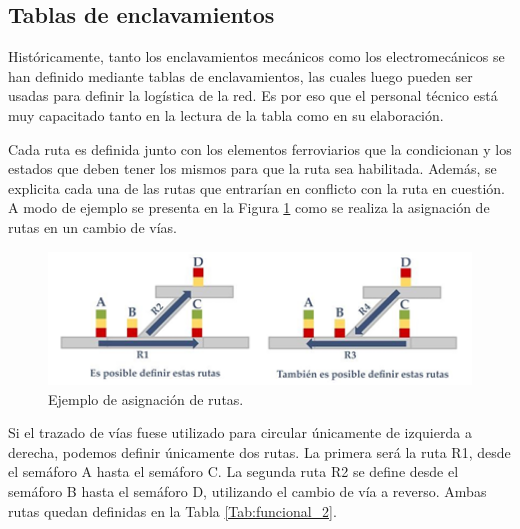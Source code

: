 \subsection{Tablas de enclavamientos}
	\label{sec:tablas}
	Históricamente, tanto los enclavamientos mecánicos como los electromecánicos se han definido mediante tablas de enclavamientos, las cuales luego pueden ser usadas para definir la logística de la red. Es por eso que el personal técnico está muy capacitado tanto en la lectura de la tabla como en su elaboración.
	
	Cada ruta es definida junto con los elementos ferroviarios que la condicionan y los estados que deben tener los mismos para que la ruta sea habilitada. Además, se explicita cada una de las rutas que entrarían en conflicto con la ruta en cuestión. A modo de ejemplo se presenta en la Figura \ref{fig:funcional_1} como se realiza la asignación de rutas en un cambio de vías.
	
	\begin{figure}[h]
		\centering
		\includegraphics[width=1\textwidth]{Figuras/rutas.PNG}
		\centering\caption{Ejemplo de asignación de rutas.}
		\label{fig:funcional_1}
	\end{figure}
	
	Si el trazado de vías fuese utilizado para circular únicamente de izquierda a derecha, podemos definir únicamente dos rutas. La primera será la ruta R1, desde el semáforo A hasta el semáforo C. La segunda ruta R2 se define desde el semáforo B hasta el semáforo D, utilizando el cambio de vía a reverso. Ambas rutas quedan definidas en la Tabla \ref{Tab:funcional_2}.
	
	\begin{table}[!h]
		{
			\caption{Tabla de enclavamientos (rutas de izquierda a derecha).}
			\label{Tab:funcional_2}
			\centering
			\begin{center}
			\end{center}
		}    
	\end{table}
	
